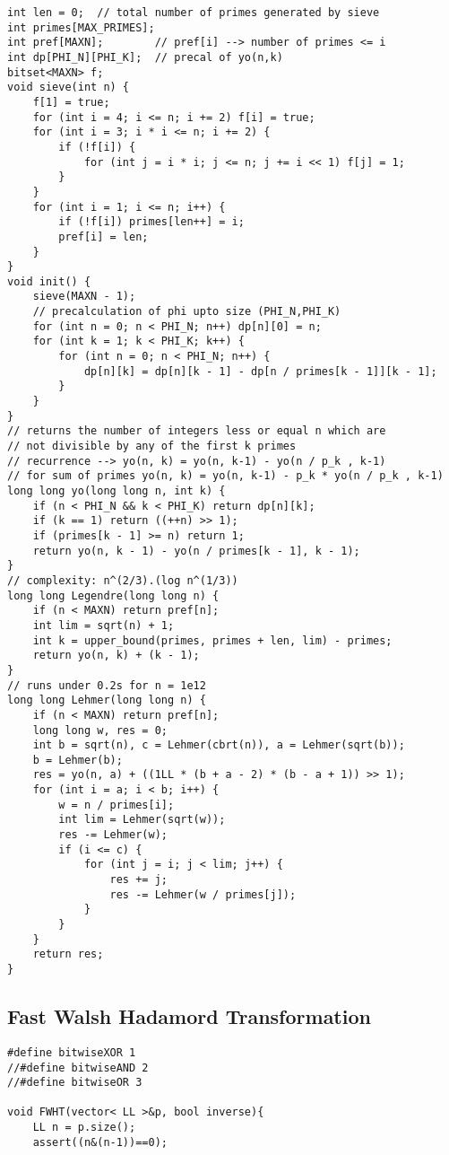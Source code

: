 \documentclass[10pt,a4paper,onesided]{article}
\begin{document}
\begin{multicols*}{3}
\begin{lstlisting}
int len = 0;  // total number of primes generated by sieve
int primes[MAX_PRIMES];
int pref[MAXN];        // pref[i] --> number of primes <= i
int dp[PHI_N][PHI_K];  // precal of yo(n,k)
bitset<MAXN> f;
void sieve(int n) {
    f[1] = true;
    for (int i = 4; i <= n; i += 2) f[i] = true;
    for (int i = 3; i * i <= n; i += 2) {
        if (!f[i]) {
            for (int j = i * i; j <= n; j += i << 1) f[j] = 1;
        }
    }
    for (int i = 1; i <= n; i++) {
        if (!f[i]) primes[len++] = i;
        pref[i] = len;
    }
}
void init() {
    sieve(MAXN - 1);
    // precalculation of phi upto size (PHI_N,PHI_K)
    for (int n = 0; n < PHI_N; n++) dp[n][0] = n;
    for (int k = 1; k < PHI_K; k++) {
        for (int n = 0; n < PHI_N; n++) {
            dp[n][k] = dp[n][k - 1] - dp[n / primes[k - 1]][k - 1];
        }
    }
}
// returns the number of integers less or equal n which are
// not divisible by any of the first k primes
// recurrence --> yo(n, k) = yo(n, k-1) - yo(n / p_k , k-1)
// for sum of primes yo(n, k) = yo(n, k-1) - p_k * yo(n / p_k , k-1)
long long yo(long long n, int k) {
    if (n < PHI_N && k < PHI_K) return dp[n][k];
    if (k == 1) return ((++n) >> 1);
    if (primes[k - 1] >= n) return 1;
    return yo(n, k - 1) - yo(n / primes[k - 1], k - 1);
}
// complexity: n^(2/3).(log n^(1/3))
long long Legendre(long long n) {
    if (n < MAXN) return pref[n];
    int lim = sqrt(n) + 1;
    int k = upper_bound(primes, primes + len, lim) - primes;
    return yo(n, k) + (k - 1);
}
// runs under 0.2s for n = 1e12
long long Lehmer(long long n) {
    if (n < MAXN) return pref[n];
    long long w, res = 0;
    int b = sqrt(n), c = Lehmer(cbrt(n)), a = Lehmer(sqrt(b));
    b = Lehmer(b);
    res = yo(n, a) + ((1LL * (b + a - 2) * (b - a + 1)) >> 1);
    for (int i = a; i < b; i++) {
        w = n / primes[i];
        int lim = Lehmer(sqrt(w));
        res -= Lehmer(w);
        if (i <= c) {
            for (int j = i; j < lim; j++) {
                res += j;
                res -= Lehmer(w / primes[j]);
            }
        }
    }
    return res;
}
\end{lstlisting}
\subsection{Fast Walsh Hadamord Transformation}
\begin{lstlisting}
#define bitwiseXOR 1
//#define bitwiseAND 2
//#define bitwiseOR 3

void FWHT(vector< LL >&p, bool inverse){
    LL n = p.size();
    assert((n&(n-1))==0);


\end{lstlisting}
\end{multicols*}
\end{document}

